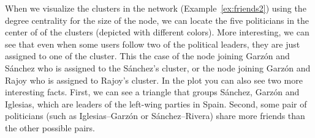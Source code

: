 
When we visualize the clusters in the network (Example~\ref{ex:friends2}) using the degree centrality for the size of the node, we can locate the five politicians in the center of of the clusters (depicted with different colors). More interesting, we can see that even when some users follow two of the political leaders, they are just assigned to one of the cluster. This the case of the node joining Garz\'on and S\'anchez who is assigned to the S\'anchez's cluster, or the node joining Garz\'on and Rajoy who is assigned to Rajoy's cluster. In the plot you can also see two more interesting facts. First, we can see a triangle that groups S\'anchez, Garz\'on and Iglesias, which are leaders of the left-wing parties in Spain. Second, some pair of politicians (such as Iglesias--Garz\'on or S\'anchez--Rivera) share more friends than the other possible pairs.

